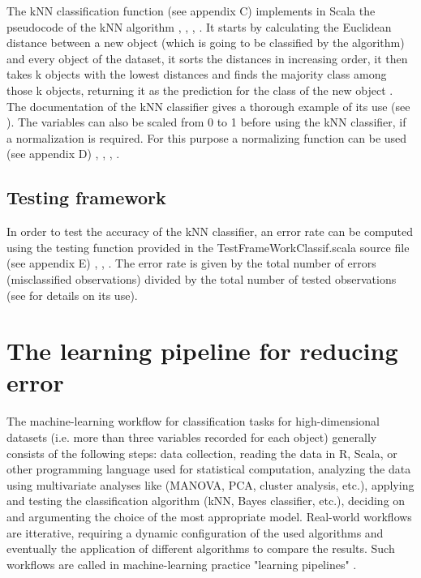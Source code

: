 \documentclass[twoside, 11p]{article}
\begin{document}
The kNN classification function (see appendix C) implements in Scala the pseudocode of the kNN algorithm \cite{harrington_machine_2012}, \cite{odersky_programming_2010}, \cite{swartz_learning_2015}, \cite{noauthor_scala_2003}. 
It starts by calculating the Euclidean distance between a new object (which is going to be classified by the algorithm) and every object of the dataset, it sorts the distances in increasing order, it then takes k objects with the lowest distances and finds the majority class among those k objects, returning it as the prediction for the class of the new object \cite{harrington_machine_2012}.
The documentation of the kNN classifier gives a thorough example of its use (see \cite{tesileanu_introduction_2017}). 
The variables can also be scaled from 0 to 1 before using the kNN classifier, if a normalization is required. For this purpose a normalizing function can be used (see appendix D) \cite{quinn_experimental_2002}, \cite{harrington_machine_2012}, \cite{odersky_programming_2010}, \cite{noauthor_scala_2003}. 

\subsection{Testing framework}    

In order to test the accuracy of the kNN classifier, an error rate can be computed using the testing function provided in the TestFrameWorkClassif.scala source file (see appendix E) \cite{harrington_machine_2012}, \cite{odersky_programming_2010}, \cite{noauthor_scala_2003}.
 The error rate is given by the total number of errors (misclassified observations) divided by the total number of tested observations (see \cite{tesileanu_introduction_2017} for details on its use). 

\section{The learning pipeline for reducing error}

The machine-learning workflow for classification tasks for high-dimensional datasets (i.e. more than three variables recorded for each object) generally consists of the following steps: data collection, reading the data in R, Scala, or other programming language used for statistical computation, analyzing the data using multivariate analyses like (MANOVA, PCA, cluster analysis, etc.), applying and testing the classification algorithm (kNN, Bayes classifier, etc.), deciding on and argumenting the choice of the most appropriate model. 
 Real-world workflows are itterative, requiring a dynamic configuration of the used algorithms and eventually the application of different algorithms to compare the results.
 Such workflows are called in machine-learning practice "learning pipelines" \cite{karau_learning_2015}.\\
\end{document}
